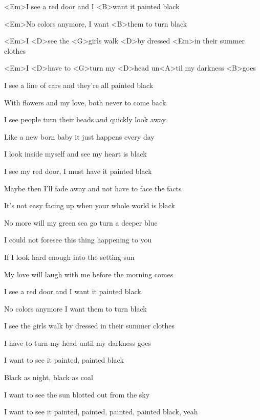 


\zs
<Em>I see a red door and I <B>want it painted black

<Em>No colors anymore, I want <B>them to turn black

<Em>I <D>see the <G>girls walk <D>by dressed <Em>in their summer clothes

<Em>I <D>have to <G>turn my <D>head un<A>til my darkness <B>goes
\ks

\zs
I see a line of cars and they're all painted black

With flowers and my love, both never to come back

I see people turn their heads and quickly look away

Like a new born baby it just happens every day
\ks

\zs
I look inside myself and see my heart is black

I see my red door, I must have it painted black

Maybe then I'll fade away and not have to face the facts

It's not easy facing up when your whole world is black
\ks

\zs
No more will my green sea go turn a deeper blue

I could not foresee this thing happening to you

If I look hard enough into the setting sun

My love will laugh with me before the morning comes
\ks

\zs
I see a red door and I want it painted black

No colors anymore I want them to turn black

I see the girls walk by dressed in their summer clothes

I have to turn my head until my darkness goes
\ks

\zs
I want to see it painted, painted black

Black as night, black as coal

I want to see the sun blotted out from the sky

I want to see it painted, painted, painted, painted black, yeah
\ks

\kp
